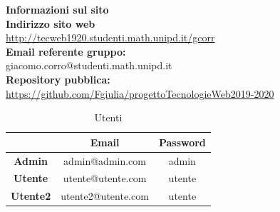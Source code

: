\begin{center}
	\textbf{\Large{Informazioni sul sito}}\\
	\textbf{Indirizzo sito web} \\ \url{http://tecweb1920.studenti.math.unipd.it/gcorr}\\
	\textbf{Email referente gruppo:} \\ giacomo.corro@studenti.math.unipd.it \\
	\textbf{Repository pubblica:} \\ \url{https://github.com/Fgiulia/progettoTecnologieWeb2019-2020}\\
	\renewcommand{\arraystretch}{1.8}
	\begin{longtable}[H]{c c c}
		\caption{Utenti}\\
		\rowcolor[HTML]{58c25d}
		\multicolumn{1}{c}{\color[HTML]{FFFFFF} \textbf{Utente}} &
		\multicolumn{1}{c}{\color[HTML]{FFFFFF} \textbf{Email}} &
		\multicolumn{1}{c}{\color[HTML]{FFFFFF} \textbf{Password}} \\
		\endhead
		\textbf{Admin} & admin@admin.com & admin\\
		\textbf{Utente} & utente@utente.com & utente\\
		\textbf{Utente2} & utente2@utente.com & utente\\
	\end{longtable}
\end{center}
